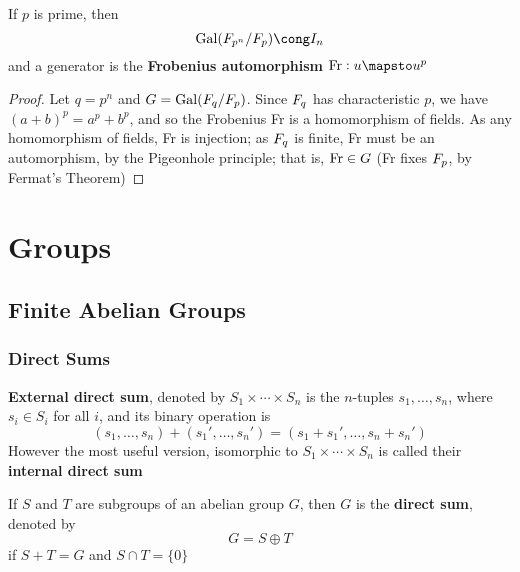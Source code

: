 \documentclass[11pt]{article}
\begin{document}
\begin{theorem}[]
If \(p\) is prime, then
\begin{equation*}
\Gal(\F_{p^n}/\F_p)\cong\I_n
\end{equation*}
and a generator is the \textbf{Frobenius automorphism}  \(\Fr:u\mapsto u^p\)
\end{theorem}

\begin{proof}
Let \(q=p^n\) and \(G=\operatorname{Gal}(\relax{F}_q/\relax{F}_p)\). Since \(\relax{F}_q\) has characteristic
\(p\), we have \((a+b)^p=a^p+b^p\), and so the Frobenius Fr is a homomorphism
of fields. As any homomorphism of fields, Fr is injection; as \(\relax{F}_q\) is
finite, Fr must be an automorphism, by the Pigeonhole principle; that is,
\(\operatorname{Fr}\in G\) (Fr fixes \(\relax{F}_p\), by Fermat's Theorem)
\end{proof}



\section{Groups }
\label{sec:org386ef9b}
\subsection{Finite Abelian Groups}
\label{sec:orgcfbb695}
\subsubsection{Direct Sums}
\label{sec:org24eb62a}
\textbf{External direct sum}, denoted by \(S_1\times\cdots\times S_n\) is the
\(n\)-tuples \(s_1,\dots,s_n\), where \(s_i\in S_i\) for all \(i\), and its
binary operation is 
\begin{equation*}
(s_1,\dots,s_n)+(s_1',\dots,s_n')=(s_1+s_1',\dots,s_n+s_n')
\end{equation*}
However the most useful version, isomorphic to \(S_1\times\cdots\times S_n\)
is called their \textbf{internal direct sum}

\begin{definition}[]
If \(S\) and \(T\) are subgroups of an abelian group \(G\), then \(G\) is the
\textbf{direct sum}, denoted by
\begin{equation*}
G=S\oplus T
\end{equation*}
if \(S+T=G\) and \(S\cap T=\{0\}\)
\end{definition}
\end{document}
